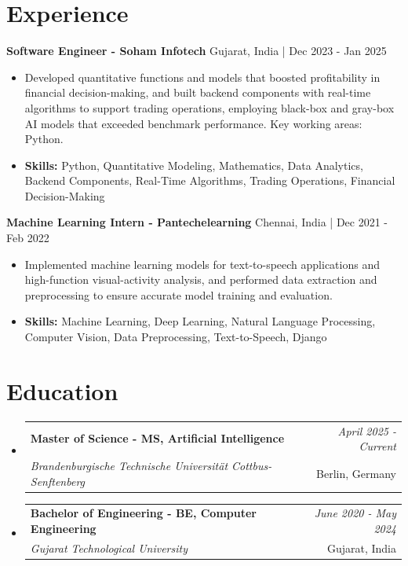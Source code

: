 \documentclass[a4paper,11pt]{article}
\makeatletter
\newcommand{\resumeSubheading}[4]{
\vspace{0.5mm}\item
    \begin{tabular*}{0.98\textwidth}[t]{l@{\extracolsep{\fill}}r}
        \textbf{#1} & \textit{\footnotesize{#4}} \\
        \textit{\footnotesize{#3}} &  \footnotesize{#2}\\
    \end{tabular*}
    \vspace{-2.4mm}
}
\makeatother
\begin{document}
\section{\textbf{Experience}}


\vspace{1mm}
  \textbf{Software Engineer - Soham Infotech} \hfill Gujarat, India | Dec 2023 - Jan 2025
\vspace{-1.5mm} %
\begin{itemize}
  \item Developed quantitative functions and models that boosted profitability in financial decision-making, and built backend components with real-time algorithms to support trading operations, employing black-box and gray-box AI models that exceeded benchmark performance. Key working areas: Python.

\vspace{-2mm}
  \item \textbf{Skills:} Python, Quantitative Modeling, Mathematics, Data Analytics, Backend Components, Real-Time Algorithms, Trading Operations, Financial Decision-Making
\end{itemize}

\vspace{1mm}
  \textbf{Machine Learning Intern - Pantechelearning} \hfill Chennai, India | Dec 2021 - Feb 2022
\vspace{-1.5mm} %
\begin{itemize}
  \item Implemented machine learning models for text-to-speech applications and high-function visual-activity analysis, and performed data extraction and preprocessing to ensure accurate model training and evaluation.
\vspace{-2mm}
  \item \textbf{Skills:} Machine Learning, Deep Learning, Natural Language Processing, Computer Vision, Data Preprocessing, Text-to-Speech, Django
\end{itemize}\section{\textbf{Education}}
\vspace{-0.4mm}

\begin{itemize}
\resumeSubheading
{Master of Science - MS, Artificial Intelligence }{Berlin, Germany}
{Brandenburgische Technische Universität Cottbus-Senftenberg  }{April 2025 - Current}

\vspace{1.0mm} %
\resumeSubheading
{Bachelor of Engineering - BE, Computer Engineering  }{Gujarat, India}
{Gujarat Technological University }{June 2020 - May 2024}

\end{itemize}
\end{document}
